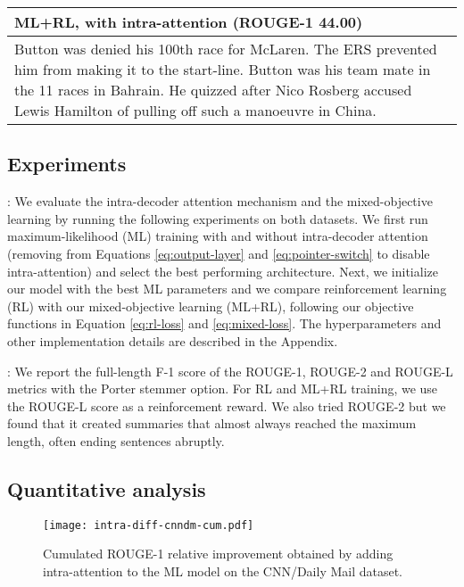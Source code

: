 \documentclass{article} \usepackage{iclr2018_arxiv,times}
\begin{document}
\begin{table*}
\begin{minipage}{\textwidth}
\begin{tabular}{|p{\textwidth}|}
{\bf ML+RL, with intra-attention (ROUGE-1 44.00)}\\\hline
Button was denied his 100th race for McLaren. The ERS prevented him from making it to the start-line. Button was his team mate in the 11 races in Bahrain. He quizzed after Nico Rosberg accused Lewis Hamilton of pulling off such a manoeuvre in China. \\\hline
\end{tabular}

\label{tab:examples}

\end{minipage}
\end{table*}

\subsection{Experiments}

: We evaluate the intra-decoder attention mechanism and the mixed-objective learning by running the following experiments on both datasets. We first run maximum-likelihood (ML) training with and without intra-decoder attention (removing  from Equations \ref{eq:output-layer} and \ref{eq:pointer-switch} to disable intra-attention) and select the best performing architecture. Next, we initialize our model with the best ML parameters and we compare reinforcement learning (RL) with our mixed-objective learning (ML+RL), following our objective functions in Equation \ref{eq:rl-loss} and \ref{eq:mixed-loss}. The hyperparameters and other implementation details are described in the Appendix.

: We report the full-length F-1 score of the ROUGE-1, ROUGE-2 and ROUGE-L metrics with the Porter stemmer option. For RL and ML+RL training, we use the ROUGE-L score as a reinforcement reward. We also tried ROUGE-2 but we found that it created summaries that almost always reached the maximum length, often ending sentences abruptly.

\subsection{Quantitative analysis}

\begin{wrapfigure}{R}{0.46\textwidth}
	\vspace{-5mm}
    \begin{center}
	\texttt{[image: intra-diff-cnndm-cum.pdf]}
    \end{center}
	\caption{Cumulated ROUGE-1 relative improvement obtained by adding intra-attention to the ML model on the CNN/Daily Mail dataset.}
    \vspace{-5mm}
	\label{fig:intra-diff-rouge}
\end{wrapfigure}
\end{document}
